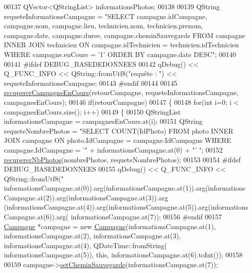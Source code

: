 \begin{DoxyCode}
00137     QVector<QStringList> informationsPhotos;
00138 
00139     QString requeteInformationsCampagne = \textcolor{stringliteral}{"SELECT campagne.idCampagne, campagne.nom, campagne.lieu,
       technicien.nom, technicien.prenom, campagne.date, campagne.duree, campagne.cheminSauvegarde FROM campagne INNER
       JOIN technicien ON campagne.idTechnicien = technicien.idTechnicien WHERE campagne.enCours = '1' ORDER BY
       campagne.date DESC"};
00140 
00141 \textcolor{preprocessor}{    #ifdef DEBUG\_BASEDEDONNEES}
00142     qDebug() << Q\_FUNC\_INFO << QString::fromUtf8(\textcolor{stringliteral}{"requête : "}) << requeteInformationsCampagne;
00143 \textcolor{preprocessor}{    #endif}
00144 
00145     \hyperlink{class_i_h_m_accueil_a0ffb0f0c7c9c613083933514690f2772}{recupererCampagneEnCours}(retourCampagne, requeteInformationsCampagne, 
      campagnesEnCours);
00146     \textcolor{keywordflow}{if}(retourCampagne)
00147     \{
00148         \textcolor{keywordflow}{for}(\textcolor{keywordtype}{int} i=0; i < campagnesEnCours.size(); i++)
00149         \{
00150             QStringList informationsCampagne = campagnesEnCours.at(i);
00151             QString requeteNombrePhotos = \textcolor{stringliteral}{"SELECT COUNT(IdPhoto) FROM photo INNER JOIN campagne ON
       photo.IdCampagne = campagne.IdCampagne WHERE campagne.IdCampagne = '"} + informationsCampagne.at(0) + \textcolor{stringliteral}{"' "};
00152             \hyperlink{class_i_h_m_accueil_aa09878b2e3e3024220291165b5c528a6}{recupererNbPhotos}(nombrePhotos, requeteNombrePhotos);
00153 
00154 \textcolor{preprocessor}{            #ifdef DEBUG\_BASEDEDONNEES}
00155             qDebug() << Q\_FUNC\_INFO << QString::fromUtf8(\textcolor{stringliteral}{"%
      informationsCampagne.at(0)).arg(informationsCampagne.at(1)).arg(informationsCampagne.at(2)).arg(informationsCampagne.at(3)).arg
      (informationsCampagne.at(4)).arg(informationsCampagne.at(5)).arg(informationsCampagne.at(6)).arg(
      informationsCampagne.at(7));
00156 \textcolor{preprocessor}{            #endif}
00157             \hyperlink{class_campagne}{Campagne} *campagne = \textcolor{keyword}{new} \hyperlink{class_campagne}{Campagne}(informationsCampagne.at(1), 
      informationsCampagne.at(2), informationsCampagne.at(3), informationsCampagne.at(4), QDateTime::fromString(
      informationsCampagne.at(5)), \textcolor{keyword}{this}, informationsCampagne.at(6).toInt());
00158 
00159             campagne->\hyperlink{class_campagne_a68c7eb6776e46306b10f1ca2a409ae6e}{setCheminSauvegarde}(informationsCampagne.at(7));
}
\end{DoxyCode}
